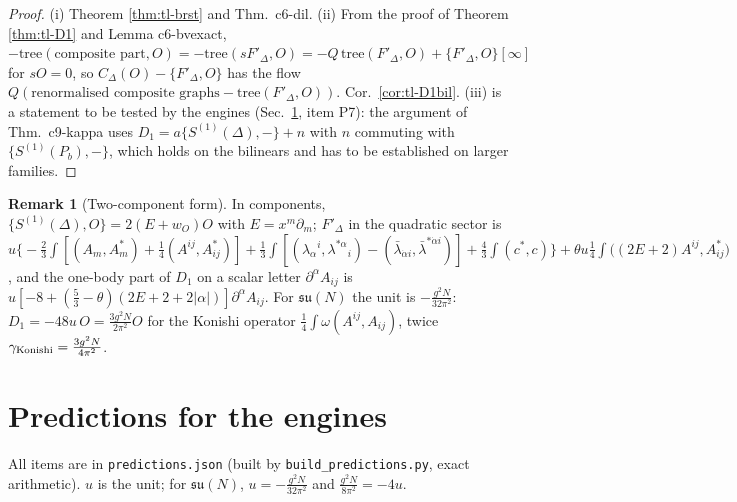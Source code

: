 \documentclass[11pt]{article}
\numberwithin{equation}{section}
\theoremstyle{plain}
\theoremstyle{definition}
\newtheorem{remark}[theorem]{Remark}
\begin{document}
\begin{proof}
(i) Theorem \ref{thm:tl-brst} and Thm.~c6-dil. (ii) From the proof of Theorem \ref{thm:tl-D1} and Lemma c6-bvexact, $-\mathrm{tree}(\text{composite part},O)=-\mathrm{tree}(sF'_\Delta,O)=-Q\,\mathrm{tree}(F'_\Delta,O)+\{F'_\Delta,O\}[\infty]$ for $sO=0$, so $C_\Delta(O)-\{F'_\Delta,O\}$ has the flow $Q(\text{renormalised composite graphs}-\mathrm{tree}(F'_\Delta,O))$. Cor.~\ref{cor:tl-D1bil}. (iii) is a statement to be tested by the engines (Sec.~\ref{sec:tl-pred}, item P7): the argument of Thm.~c9-kappa uses $D_1=a\{S^{(1)}(\Delta),-\}+n$ with $n$ commuting with $\{S^{(1)}(P_b),-\}$, which holds on the bilinears and has to be established on larger families.
\end{proof}

\begin{remark}[Two-component form]
In components, $\{S^{(1)}(\Delta),O\}=2(E+w_O)O$ with $E=x^m\partial_m$; $F'_\Delta$ in the quadratic sector is $u\big\{-\tfrac23\int[(A_m,A^*_m)+\tfrac14(A^{ij},A^*_{ij})]+\tfrac13\int[(\lambda_\alpha{}^i,\lambda^{*\alpha}{}_i)-(\bar\lambda_{\dot\alpha i},\bar\lambda^{*\dot\alpha i})]+\tfrac43\int(c^*,c)\big\}+\theta u\tfrac14\int\big((2E+2)A^{ij},A^*_{ij}\big)$, and the one-body part of $D_1$ on a scalar letter $\partial^\alpha A_{ij}$ is $u[-8+(\tfrac53-\theta)(2E+2+2|\alpha|)]\partial^\alpha A_{ij}$. For $\mathfrak{su}(N)$ the unit is $-\tfrac{g^2N}{32\pi^2}$: $D_1=-48u\,O=\tfrac{3g^2N}{2\pi^2}O$ for the Konishi operator $\tfrac14\int\omega(A^{ij},A_{ij})$, twice $\gamma_{\rm Konishi}=\tfrac{3g^2N}{4\pi^2}$.
\end{remark}


\section{Predictions for the engines}
\label{sec:tl-pred}

All items are in \texttt{predictions.json} (built by \texttt{build\_predictions.py}, exact arithmetic). $u$ is the unit; for $\mathfrak{su}(N)$, $u=-\frac{g^2N}{32\pi^2}$ and $\frac{g^2N}{8\pi^2}=-4u$.
\end{document}
